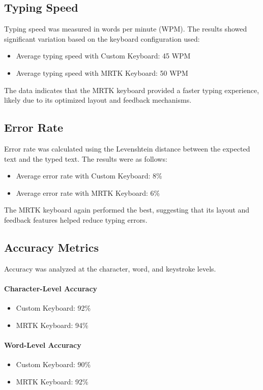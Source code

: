 \subsection{Typing Speed}
Typing speed was measured in words per minute (WPM). The results showed significant variation based on the keyboard configuration used:
\begin{itemize}
    \item Average typing speed with Custom Keyboard: 45 WPM
    \item Average typing speed with MRTK Keyboard: 50 WPM
\end{itemize}
The data indicates that the MRTK keyboard provided a faster typing experience, likely due to its optimized layout and feedback mechanisms.

\subsection{Error Rate}
Error rate was calculated using the Levenshtein distance between the expected text and the typed text. The results were as follows:
\begin{itemize}
    \item Average error rate with Custom Keyboard: 8\%
    \item Average error rate with MRTK Keyboard: 6\%
\end{itemize}
The MRTK keyboard again performed the best, suggesting that its layout and feedback features helped reduce typing errors.

\subsection{Accuracy Metrics}
Accuracy was analyzed at the character, word, and keystroke levels.

\paragraph{Character-Level Accuracy}
\begin{itemize}
    \item Custom Keyboard: 92\%
    \item MRTK Keyboard: 94\%
\end{itemize}

\paragraph{Word-Level Accuracy}
\begin{itemize}
    \item Custom Keyboard: 90\%
    \item MRTK Keyboard: 92\%
\end{itemize}

